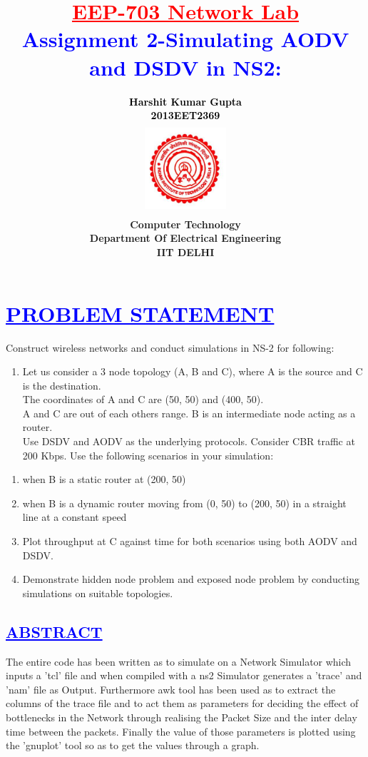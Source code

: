 \documentclass[a4paper,12pt]{report}
\title{\bfseries\huge \textcolor{red}{\underline {EEP-703 Network Lab}} \\{\textcolor{blue}{Assignment 2-Simulating AODV and DSDV in NS2:}}}
\author{\bfseries\large\textcolor{black} {Harshit Kumar Gupta}\\ {\textcolor{black}{2013EET2369}}\\
\includegraphics[width=3cm,height=3.4cm]{./iit.png}\\\noindent Computer Technology\\
\noindent Department Of Electrical Engineering\\IIT DELHI}
\begin{document}
\maketitle
\tableofcontents


\chapter{\textcolor{blue}{\underline {PROBLEM STATEMENT}}}
\noindent 
Construct wireless networks and conduct simulations in NS-2 for following:
\begin{enumerate}
 \item  Let us consider a 3 node topology (A, B and C), where A is the source and C is the destination. 
\\The coordinates of A and C are (50, 50) and (400, 50). 
\\A and C are out of each others range. B is an intermediate node acting as a router. 
\\Use DSDV and AODV as the underlying protocols. Consider CBR traffic at 200 Kbps. Use the following scenarios in your simulation:
\end{enumerate}

\begin{enumerate}
 \item  when B is a static router at (200, 50)

\item when B is a dynamic router moving from (0, 50) to (200, 50) in a straight line at a constant speed

\item Plot throughput at C against time for both scenarios using both AODV and DSDV.


\item  Demonstrate hidden node problem and exposed node problem by conducting simulations on suitable topologies. 
\end{enumerate}
\begin{center}
\chapter{\textcolor{blue}{\underline {ABSTRACT}}}
\end{center}
\noindent The entire code has been written as to simulate on a Network Simulator which inputs a 'tcl' file and when compiled with a ns2 Simulator generates a 'trace' and 'nam' file as Output.
	  Furthermore awk tool has been used as to extract the columns of the trace file and to act them as parameters for deciding the effect of bottlenecks in the Network through
	  realising the Packet Size and the inter delay time between the packets. Finally the value of those parameters is plotted using the 'gnuplot' tool so as to get the  values through a graph.
\end{document}

